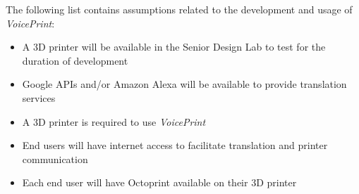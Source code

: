 The following list contains assumptions related to the development and usage of \textit{VoicePrint}:

\begin{itemize}
  \item A 3D printer will be available in the Senior Design Lab to test for the duration of development
  \item Google APIs and/or Amazon Alexa will be available to provide translation services
  \item A 3D printer is required to use \textit{VoicePrint}
  \item End users will have internet access to facilitate translation and printer communication
  \item Each end user will have Octoprint available on their 3D printer
\end{itemize}